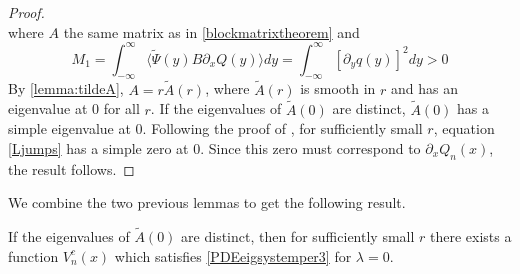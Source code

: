 \documentclass[thesis.tex]{subfiles}
\begin{document}
\begin{lemma}
\begin{proof}
\begin{equation}
\end{equation}
where $A$ the same matrix as in \cref{blockmatrixtheorem} and
\[
M_1 = 
\int_{-\infty}^\infty \langle \tilde{\Psi}(y) B \partial_x Q(y) \rangle dy =  
\int_{-\infty}^\infty [\partial_y q(y)]^2 dy > 0
\]
By \cref{lemma:tildeA}, $A = r \tilde{A}(r)$, where $\tilde{A}(r)$ is smooth in $r$ and has an eigenvalue at 0 for all $r$. If the eigenvalues of $\tilde{A}(0)$ are distinct, $\tilde{A}(0)$ has a simple eigenvalue at 0. Following the proof of \cite[Theorem 3]{Sandstede1998}, for sufficiently small $r$, equation \cref{Ljumps} has a simple zero at 0. Since this zero must correspond to $\partial_x Q_n(x)$, the result follows.
\end{proof}
\end{lemma}

We combine the two previous lemmas to get the following result.

\begin{lemma}\label{lemma:centereigenfn}
If the eigenvalues of $\tilde{A}(0)$ are distinct, then for sufficiently small $r$ there exists a function $V_n^c(x)$ which satisfies \cref{PDEeigsystemper3} for $\lambda = 0$.
\end{lemma}

\iffulldocument\else
	
	
\fi
\end{document}
